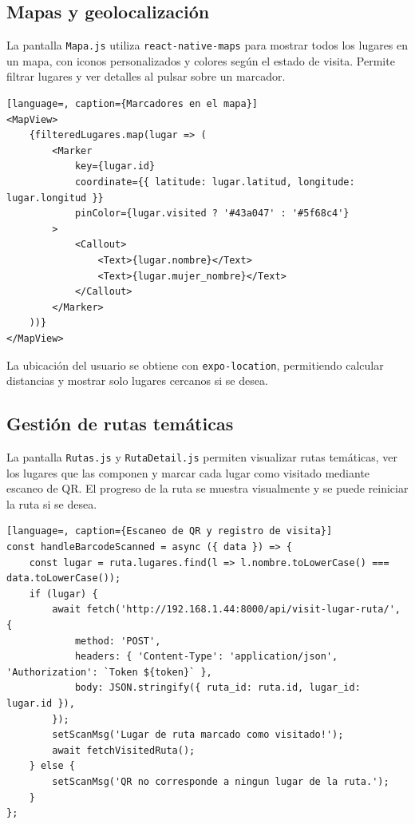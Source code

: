 \subsection{Mapas y geolocalización}

La pantalla \texttt{Mapa.js} utiliza \texttt{react-native-maps} para mostrar todos los lugares en un mapa, con iconos personalizados y colores según el estado de visita. Permite filtrar lugares y ver detalles al pulsar sobre un marcador.

\begin{lstlisting}[language=, caption={Marcadores en el mapa}]
<MapView>
    {filteredLugares.map(lugar => (
        <Marker
            key={lugar.id}
            coordinate={{ latitude: lugar.latitud, longitude: lugar.longitud }}
            pinColor={lugar.visited ? '#43a047' : '#5f68c4'}
        >
            <Callout>
                <Text>{lugar.nombre}</Text>
                <Text>{lugar.mujer_nombre}</Text>
            </Callout>
        </Marker>
    ))}
</MapView>
\end{lstlisting}

La ubicación del usuario se obtiene con \texttt{expo-location}, permitiendo calcular distancias y mostrar solo lugares cercanos si se desea.

\subsection{Gestión de rutas temáticas}

La pantalla \texttt{Rutas.js} y \texttt{RutaDetail.js} permiten visualizar rutas temáticas, ver los lugares que las componen y marcar cada lugar como visitado mediante escaneo de QR. El progreso de la ruta se muestra visualmente y se puede reiniciar la ruta si se desea.

\begin{lstlisting}[language=, caption={Escaneo de QR y registro de visita}]
const handleBarcodeScanned = async ({ data }) => {
    const lugar = ruta.lugares.find(l => l.nombre.toLowerCase() === data.toLowerCase());
    if (lugar) {
        await fetch('http://192.168.1.44:8000/api/visit-lugar-ruta/', {
            method: 'POST',
            headers: { 'Content-Type': 'application/json', 'Authorization': `Token ${token}` },
            body: JSON.stringify({ ruta_id: ruta.id, lugar_id: lugar.id }),
        });
        setScanMsg('Lugar de ruta marcado como visitado!');
        await fetchVisitedRuta();
    } else {
        setScanMsg('QR no corresponde a ningun lugar de la ruta.');
    }
};
\end{lstlisting}


